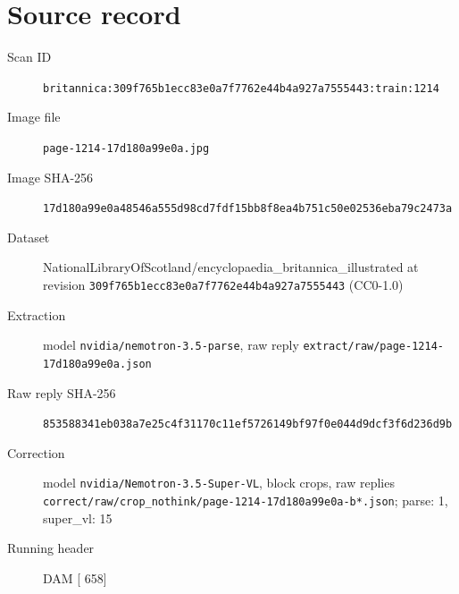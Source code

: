 \documentclass{article}
\begin{document}
\section*{Source record}
\begin{description}
\item[Scan ID] \texttt{britannica:309f765b1ecc83e0a7f7762e44b4a927a7555443:train:1214}
\item[Image file] \texttt{page-1214-17d180a99e0a.jpg}
\item[Image SHA-256] \texttt{17d180a99e0a48546a555d98cd7fdf15bb8f8ea4b751c50e02536eba79c2473a}
\item[Dataset] NationalLibraryOfScotland/encyclopaedia\_britannica\_illustrated at revision \texttt{309f765b1ecc83e0a7f7762e44b4a927a7555443} (CC0-1.0)
\item[Extraction] model \texttt{nvidia/nemotron-3.5-parse}, raw reply \texttt{extract/raw/page-1214-17d180a99e0a.json}
\item[Raw reply SHA-256] \texttt{853588341eb038a7e25c4f31170c11ef5726149bf97f0e044d9dcf3f6d236d9b}
\item[Correction] model \texttt{nvidia/Nemotron-3.5-Super-VL}, block crops, raw replies \texttt{correct/raw/crop\_nothink/page-1214-17d180a99e0a-b*.json}; parse: 1, super\_vl: 15
\item[Running header] DAM [ 658]
\end{description}
\end{document}
